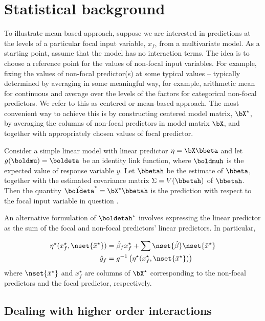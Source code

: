 \section{Statistical background}

To illustrate mean-based approach, suppose we are interested in predictions at the levels of a particular focal input variable, $x_f$, from a multivariate model. As a starting point, assume that the model has no interaction terms. The idea is to choose a reference point for the values of non-focal input variables. For example, fixing the values of non-focal predictor(s) at some typical values -- typically determined by averaging in some meaningful way, for example, arithmetic mean  for continuous and average over the levels of the factors for categorical non-focal predictors. We refer to this as centered or mean-based approach. The most convenient way to achieve this is by constructing centered model matrix, $\bX^\star$, by averaging the columns of non-focal predictors in model matrix $\bX$, and together with appropriately chosen values of focal predictor.


Consider a simple linear model with linear predictor $\eta = \bX\bbeta$ and let $g(\boldmu) = \boldeta$ be an identity link function, where $\boldmuh$ is the expected value of response variable $\hat{y}$. Let $\bbetah$ be the estimate of $\bbeta$, together with the estimated covariance matrix $\Sigma = V(\bbetah)$ of $\bbetah$. Then the quantity $\hat{\boldeta}^\star = \bX^\star\bbetah$ is the prediction with respect to the focal input variable in question \citep{fox2009effect}.

An alternative formulation of $\boldetah^\star$ involves expressing the linear predictor as the sum of the focal and non-focal predictors' linear predictors. In particular, 

\begin{align}\label{eq:eta_mean}
\eta^\star(x^\star_f, \nset{{\bar{x}^\star}}) &= \hat{\beta}_f x^\star_f + \sum \nset{\hat{\beta}} \nset{{\bar{x}^\star}} \\
\hat{y}_f  &= g^{-1} \left(\eta^\star(x^\star_f, \nset{{\bar{x}^\star}})\right)
\end{align}
where $\nset{{\bar{x}^\star}}$ and $x^\star_f$ are columns of $\bX^\star$ corresponding to the non-focal predictors and the focal predictor, respectively.


\subsection{Dealing with higher order interactions}

